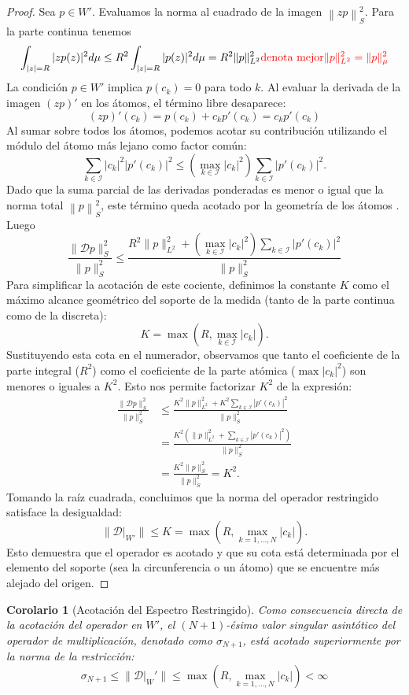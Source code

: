 \documentclass[12pt,a4paper]{article}
\newtheorem{corolario}{Corolario}
\newcommand{\norm}[1]{\left\| #1 \right\|_S}
\newcommand{\D}{\mathcal{D}}
\begin{document}
\begin{proof}
Sea $p \in W'$. Evaluamos la norma al cuadrado de la imagen $\norm{zp}^2$. Para la parte continua tenemos
$$\int_{|z|=R} |z p(z)|^2 d\mu \le R^2 \int_{|z|=R} |p(z)|^2 d\mu = R^2 \|p\|_{L^2}^2 \textcolor{red}{\text{denota mejor} \|p\|_{L^2}^2=\|p\|_{\mu}^2}$$
La condición $p \in W'$ implica $p(c_k)=0$ para todo $k$. Al evaluar la derivada de la imagen $(zp)'$ en los átomos, el término libre desaparece:
$$ (zp)'(c_k) = p(c_k) + c_k p'(c_k) = c_k p'(c_k) $$
Al sumar sobre todos los átomos, podemos acotar su contribución utilizando el módulo del átomo más lejano como factor común:
$$ \sum_{k \in \mathcal{I}}  |c_k|^2 |p'(c_k)|^2 \le \left( \max_{k \in \mathcal{I}} |c_k|^2 \right) \sum_{k \in \mathcal{I}}  |p'(c_k)|^2. $$
Dado que la suma parcial de las derivadas ponderadas es menor o igual que la norma total $\norm{p}^2$, este término queda acotado por la geometría de los átomos . Luego
$$\frac{\|\mathcal{D}p\|_S^2}{\|p\|_S^2} \le \frac{R^2 \|p\|_{L^2}^2 + \left( \max_{k \in \mathcal{I}} |c_k|^2 \right) \sum_{k \in \mathcal{I}}  |p'(c_k)|^2}{\|p\|_{S}^2}$$
Para simplificar la acotación de este cociente, definimos la constante $K$ como el máximo alcance geométrico del soporte de la medida (tanto de la parte continua como de la discreta):
$$ K = \max \left( R, \max_{k \in \mathcal{I}} |c_k| \right). $$
Sustituyendo esta cota en el numerador, observamos que tanto el coeficiente de la parte integral ($R^2$) como el coeficiente de la parte atómica ($\max |c_k|^2$) son menores o iguales a $K^2$. Esto nos permite factorizar $K^2$ de la expresión:
\begin{align*}
    \frac{\|\mathcal{D}p\|_S^2}{\|p\|_S^2} &\le \frac{K^2 \|p\|_{L^2}^2 + K^2 \sum_{k \in \mathcal{I}}  |p'(c_k)|^2}{\|p\|_{S}^2} \\
    &= \frac{K^2 \left( \|p\|_{L^2}^2 + \sum_{k \in \mathcal{I}}  |p'(c_k)|^2 \right)}{\|p\|_{S}^2} \\
    &= \frac{K^2 \|p\|_S^2}{\|p\|_S^2} = K^2.
\end{align*}
Tomando la raíz cuadrada, concluimos que la norma del operador restringido satisface la desigualdad:
$$\|\D|_{W'}\| \le K = \max \left( R, \max_{k=1,\dots,N} |c_k| \right).$$
Esto demuestra que el operador es acotado y que su cota está determinada por el elemento del soporte (sea la circunferencia o un átomo) que se encuentre más alejado del origen.
\end{proof}

\begin{corolario}[Acotación del Espectro Restringido]
Como consecuencia directa de la acotación del operador en $W'$, el $(N+1)$-ésimo valor singular asintótico del operador de multiplicación, denotado como $\sigma_{N+1}$, está acotado superiormente por la norma de la restricción:
\begin{equation}
    \sigma_{N+1} \le \|\D|_W'\| \le \max \left( R, \max_{k=1,\dots,N} |c_k| \right) < \infty
\end{equation}
\end{corolario}
\end{document}

